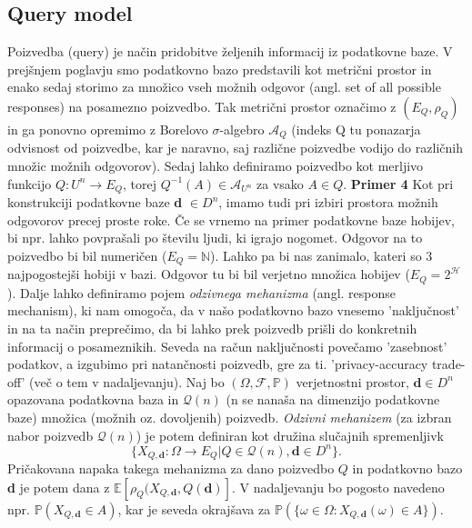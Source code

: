 \documentclass[mat1]{article}
\theoremstyle{definition}
\begin{document}
\subsection{Query model}
Poizvedba (query) je način pridobitve željenih informacij iz podatkovne baze. V prejšnjem poglavju smo podatkovno bazo predstavili kot metrični prostor in enako sedaj storimo za množico vseh možnih odgovor (angl. set of all possible responses) na posamezno poizvedbo. Tak metrični prostor označimo z $(E_{Q}, \rho_{Q})$ in ga ponovno opremimo z Borelovo $\sigma$-algebro $\mathcal{A}_{Q}$ (indeks Q tu ponazarja odvisnost od poizvedbe, kar je naravno, saj različne poizvedbe vodijo do različnih množic možnih odgovorov). Sedaj lahko definiramo poizvedbo kot merljivo funkcijo $Q: U^n \rightarrow E_{Q} $, torej $Q^{-1}(A) \in \mathcal{A}_{U^n}$ za vsako $A \in Q$.
\newline
\newline
\textbf{Primer 4} Kot pri konstrukciji podatkovne baze \textbf{d} $\in D^n$, imamo tudi pri izbiri prostora možnih odgovorov precej proste roke. Če se vrnemo na primer podatkovne baze hobijev, bi npr. lahko povprašali po številu ljudi, ki igrajo nogomet. Odgovor na to poizvedbo bi bil numeričen ($E_{Q} = \mathbb{N}$). Lahko pa bi nas zanimalo, kateri so 3 najpogostejši hobiji v bazi. Odgovor tu bi bil verjetno množica hobijev  ($E_{Q} = 2^\mathcal{H}$).
\newline
\newline
Dalje lahko definiramo pojem \textit{odzivnega mehanizma} (angl. response mechanism), ki nam omogoča, da v našo podatkovno bazo vnesemo 'naključnost' in na ta način preprečimo, da bi lahko prek poizvedb prišli do konkretnih informacij o posameznikih. Seveda na račun naključnosti povečamo 'zasebnost' podatkov, a izgubimo pri natančnosti poizvedb, gre za ti. 'privacy-accuracy trade-off' (več o tem v nadaljevanju). 
\newline 
\newline
Naj bo $(\Omega , \mathcal{F}, \mathbb {P} )$ verjetnostni prostor, $\textbf{d}\in D^n$ opazovana podatkovna baza in $\mathcal{Q}(n)$ (n se nanaša na dimenzijo podatkovne baze) množica (možnih oz. dovoljenih) poizvedb. \textit{Odzivni mehanizem} (za izbran nabor poizvedb $\mathcal{Q}(n)$) je potem definiran kot družina slučajnih spremenljivk
\begin{equation}\label{odzivni}
 \{X_{Q,\textbf{d}} : \Omega \rightarrow  E_{Q} | Q \in  \mathcal{Q} (n), \textbf{d} \in D^n\} \tag{1}.
\end{equation} 
Pričakovana napaka takega mehanizma za dano poizvedbo $Q$ in podatkovno bazo \textbf{d} je potem dana z $\mathbb{E}[\rho_{Q}(X_{Q,\textbf{d}},Q(\textbf{d})]$. V nadaljevanju bo pogosto navedeno npr. $\mathbb{P}(X_{Q,\textbf{d}} \in A)$, kar je seveda okrajšava za $\mathbb{P}(\{\omega \in \Omega : X_{Q,\textbf{d}}(\omega) \in A \})$.
\end{document}
